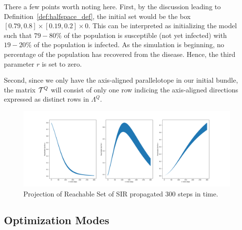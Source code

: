 \begin{example}
  There a few points worth noting here. First, by the discussion leading to Definition~\ref{def:halfspace_def}, the initial set would be the box $[0.79,0.8] \times [0.19, 0.2] \times 0$. This can be interpreted as initializing the model such that $79-80\%$ of the population is susceptible (not yet infected) with $19-20\%$ of the population is infected. As the simulation is beginning, no percentage of the population has recovered from the disease. Hence, the third parameter $r$ is set to zero.

  Second, since we only have the axis-aligned parallelotope in our initial bundle, the matrix $\mathcal{T}^Q$ will consist of only one row indicing the axis-aligned directions expressed as distinct rows in $\Lambda^Q$.

  \begin{figure}[ht]
  \label{fig:kaa_sir}
    \hspace*{-2.3cm}
    \includegraphics[width=1.3\textwidth]{figures/SIRProj.png}
    \caption{Projection of Reachable Set of SIR propagated 300 steps in time.}
  \end{figure}
\end{example}

\subsection{Optimization Modes}
